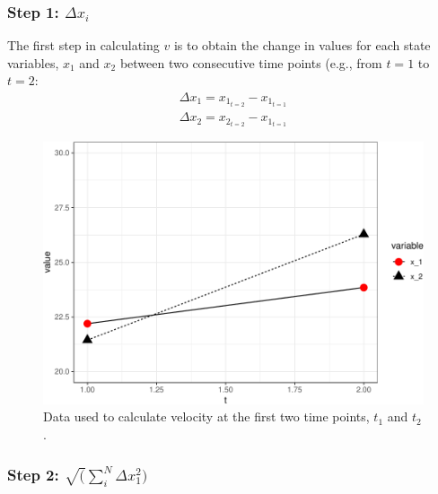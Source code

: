 \documentclass[12pt,twoside,openany]{reedthesis}
\begin{document}
\hypertarget{step-1-delta-x_i}{%
\subsubsection{\texorpdfstring{Step 1: \(\Delta x_i\)}{Step 1: \textbackslash{}Delta x\_i}}\label{step-1-delta-x_i}}

The first step in calculating \(v\) is to obtain the change in values for each state variables, \(x_1\) and \(x_2\) between two consecutive time points (e.g., from \(t=1\) to \(t=2\):
\begin{equation}
\begin{array}{rcr}
\Delta x_1 = x_{1_{t=2}} - x_{1_{t=1}} \\
\Delta x_2 = x_{2_{t=2}} - x_{1_{t=1}}
  \end{array}
\label{eq:diffX}
\end{equation}
\begin{figure}

{\centering \includegraphics[width=0.95\linewidth]{_myDissertation_files/figure-latex/sysEx2-1} 

}

\caption{Data used to calculate velocity at the first two time points, $t_1$ and $t_2$.}\label{fig:sysEx2}
\end{figure}
\hypertarget{step-2-sqrtsum_indelta-x_12}{%
\subsubsection{\texorpdfstring{Step 2: \(\sqrt(\sum_i^N\Delta x_1^2)\)}{Step 2: \textbackslash{}sqrt(\textbackslash{}sum\_i\^{}N\textbackslash{}Delta x\_1\^{}2)}}\label{step-2-sqrtsum_indelta-x_12}}
\end{document}
